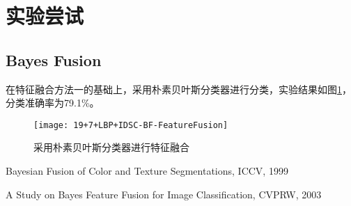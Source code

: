 \section{实验尝试}
%

\subsection{Bayes Fusion}
在特征融合方法一的基础上，采用朴素贝叶斯分类器进行分类，实验结果如图\ref{fig:19+7+LBP+IDSC-BF-FeatureFusion}，分类准确率为79.1\%。
\begin{figure}[!ht]
\centering
\texttt{[image: 19+7+LBP+IDSC-BF-FeatureFusion]}
\caption{采用朴素贝叶斯分类器进行特征融合}
\label{fig:19+7+LBP+IDSC-BF-FeatureFusion}
\end{figure}

Bayesian Fusion of Color and Texture Segmentations, ICCV, 1999

A Study on Bayes Feature Fusion for Image Classification, CVPRW, 2003


